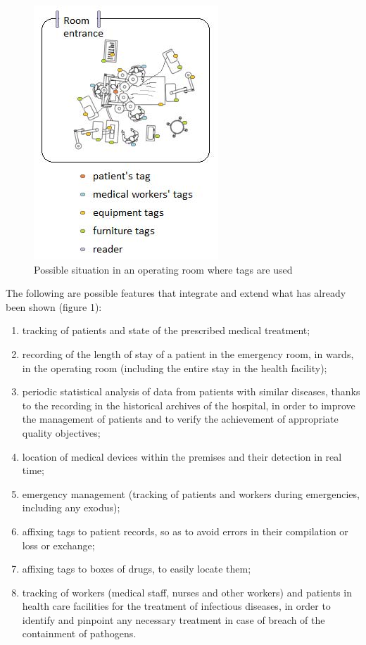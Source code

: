 \begin{figure}[h!]
	\centering
	\includegraphics[scale=1]{1.png}
	\caption[Possible situation in an operating room where tags are used]{Possible situation in an operating room where tags are used}
\end{figure}

The following are possible features that integrate and extend what has already been shown (figure 1): 

\begin{enumerate}
	\item tracking of patients and state of the prescribed medical treatment; 
	\item recording of the length of stay of a patient in the emergency room, in wards, in the operating room (including the entire stay in the health facility); 
	\item periodic statistical analysis of data from patients with similar diseases, thanks to the recording in the historical archives of the hospital, in order to improve the management of patients and to verify the achievement of appropriate quality objectives; 
	\item location of medical devices within the premises and their detection in real time; 
	\item emergency management (tracking of patients and workers during emergencies, including any exodus); 
	\item affixing tags to patient records, so as to avoid errors in their compilation or loss or exchange; 
	\item affixing tags to boxes of drugs, to easily locate them; 
	\item tracking of workers (medical staff, nurses and other workers) and patients in health care facilities for the treatment of infectious diseases, in order to identify and pinpoint any necessary treatment in case of breach of the containment of pathogens.  
\end{enumerate}

